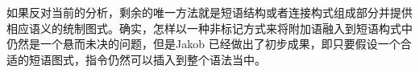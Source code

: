 \begin{exe}
\begin{xlist}[iv.]
\begin{exe}
\begin{xlist}[iv.]

如果反对当前的分析，剩余的唯一方法就是短语结构或者连接构式组成部分并提供相应语义的统制图式。确实，怎样以一种非标记方式来将附加语融入到短语构式中仍然是一个悬而未决的问题，但是Jakob  \citet{Mache2010a}已经做出了初步成果，即只要假设一个合适的短语图式，指令仍然可以插入到整个语法当中。


\end{xlist}
\end{exe}
\end{xlist}
\end{exe}
